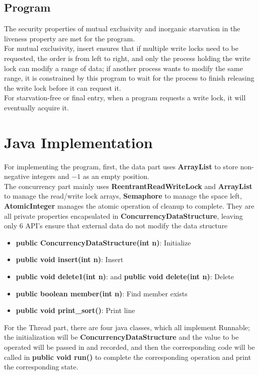 \subsection{Program}
\label{sec:Program}
The security properties of mutual exclusivity and inorganic starvation in the liveness property are met for the program.\vspace{8pt}\\
For mutual exclusivity, insert ensures that if multiple write locks need to be requested, the order is from left to right, and only the process holding the write lock can modify a range of data; if another process wants to modify the same range, it is constrained by this program to wait for the process to finish releasing the write lock before it can request it. \vspace{8pt}\\
For starvation-free or final entry, when a program requests a write lock, it will eventually acquire it.

\section{Java Implementation}
\label{chap:Java Implementation}
For implementing the program, first, the data part uses \textbf{ArrayList} to store non-negative integers and $-1$ as an empty position.\vspace{8pt}\\
The concurrency part mainly uses \textbf{ReentrantReadWriteLock} and \textbf{ArrayList} to manage the read/write lock arrays,
\textbf{Semaphore} to manage the space left, \textbf{AtomicInteger} manages the atomic operation of cleanup to complete. They are all private properties encapsulated in \textbf{ConcurrencyDataStructure}, leaving only 6 API's ensure that external data do not modify the data structure
\begin{itemize}
    \item \textbf{public ConcurrencyDataStructure(int n)}: Initialize
    \item \textbf{public void insert(int n)}: Insert
    \item \textbf{public void delete1(int n)}: and \textbf{public void delete(int n)}: Delete
    \item \textbf{public boolean member(int n)}: Find member exists
    \item \textbf{public void print\_sort()}: Print line
\end{itemize}
For the Thread part, there are four java classes, which all implement Runnable; the initialization will be \textbf{ConcurrencyDataStructure} and the value to be operated will be passed in and recorded, and then the corresponding code will be called in \textbf{public void run()} to complete the corresponding operation and print the corresponding state.

